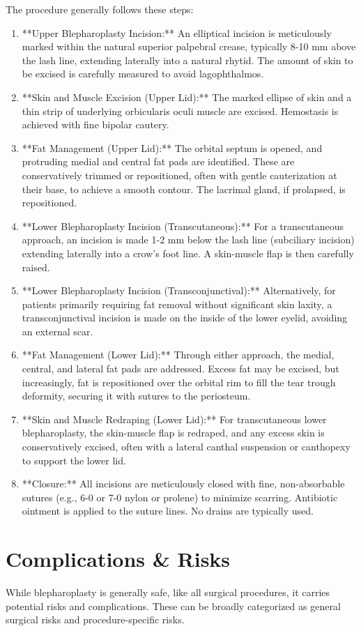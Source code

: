 The procedure generally follows these steps:
\begin{enumerate}
  \item **Upper Blepharoplasty Incision:** An elliptical incision is meticulously marked within the natural superior palpebral crease, typically 8-10 mm above the lash line, extending laterally into a natural rhytid. The amount of skin to be excised is carefully measured to avoid lagophthalmos.
  \item **Skin and Muscle Excision (Upper Lid):** The marked ellipse of skin and a thin strip of underlying orbicularis oculi muscle are excised. Hemostasis is achieved with fine bipolar cautery.
  \item **Fat Management (Upper Lid):** The orbital septum is opened, and protruding medial and central fat pads are identified. These are conservatively trimmed or repositioned, often with gentle cauterization at their base, to achieve a smooth contour. The lacrimal gland, if prolapsed, is repositioned.
  \item **Lower Blepharoplasty Incision (Transcutaneous):** For a transcutaneous approach, an incision is made 1-2 mm below the lash line (subciliary incision) extending laterally into a crow's foot line. A skin-muscle flap is then carefully raised.
  \item **Lower Blepharoplasty Incision (Transconjunctival):** Alternatively, for patients primarily requiring fat removal without significant skin laxity, a transconjunctival incision is made on the inside of the lower eyelid, avoiding an external scar.
  \item **Fat Management (Lower Lid):** Through either approach, the medial, central, and lateral fat pads are addressed. Excess fat may be excised, but increasingly, fat is repositioned over the orbital rim to fill the tear trough deformity, securing it with sutures to the periosteum.
  \item **Skin and Muscle Redraping (Lower Lid):** For transcutaneous lower blepharoplasty, the skin-muscle flap is redraped, and any excess skin is conservatively excised, often with a lateral canthal suspension or canthopexy to support the lower lid.
  \item **Closure:** All incisions are meticulously closed with fine, non-absorbable sutures (e.g., 6-0 or 7-0 nylon or prolene) to minimize scarring. Antibiotic ointment is applied to the suture lines. No drains are typically used.
\end{enumerate}

\section*{Complications \& Risks}
While blepharoplasty is generally safe, like all surgical procedures, it carries potential risks and complications. These can be broadly categorized as general surgical risks and procedure-specific risks.

